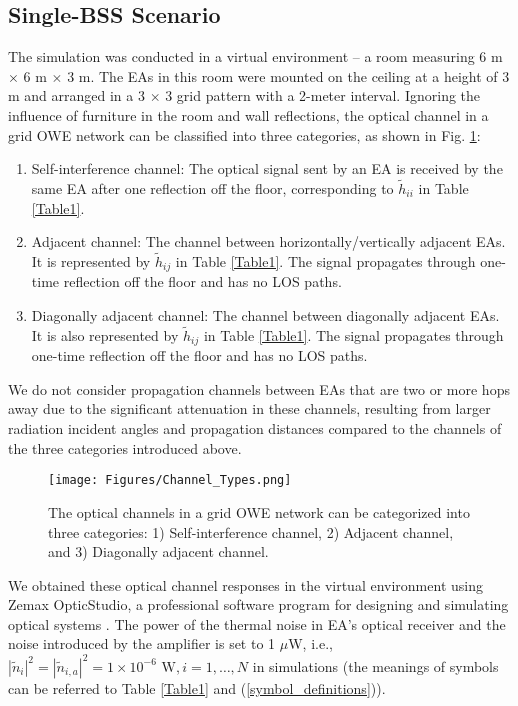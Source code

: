 \subsection{Single-BSS Scenario}
The simulation was conducted in a virtual environment -- a room measuring 6 m $\times$ 6 m $\times$ 3 m. The EAs in this room were mounted on the ceiling at a height of 3 m and arranged in a 3 $\times$ 3 grid pattern with a 2-meter interval.
Ignoring the influence of furniture in the room and wall reflections, the optical channel in a grid OWE network can be classified into three categories, as shown in Fig. \ref{channel_types}:
\begin{enumerate}
\item Self-interference channel: The optical signal sent by an EA is received by the same EA after one reflection off the floor, corresponding to $\widetilde{h}_{ii}$ in Table \ref{Table1}.
\item Adjacent channel: The channel between horizontally/vertically adjacent EAs. It is represented by $\widetilde{h}_{ij}$ in Table \ref{Table1}. The signal propagates through one-time reflection off the floor and has no LOS paths.
\item Diagonally adjacent channel: The channel between diagonally adjacent EAs. It is also represented by $\widetilde{h}_{ij}$ in Table \ref{Table1}. The signal propagates through one-time reflection off the floor and has no LOS paths.
\end{enumerate}
We do not consider propagation channels between EAs that are two or more hops away due to the significant attenuation in these channels, resulting from larger radiation incident angles and propagation distances compared to the channels of the three categories introduced above.
\begin{figure}
\centering
\texttt{[image: Figures/Channel\_Types.png]}
\caption{The optical channels in a grid OWE network can be categorized into three categories: 1) Self-interference channel, 2) Adjacent channel, and 3) Diagonally adjacent channel.}
\label{channel_types}
\vspace{-0.4cm}
\end{figure}
\par
We obtained these optical channel responses in the virtual environment using Zemax OpticStudio, a professional software program for designing and simulating optical systems \cite{ansys}. The power of the thermal noise in EA's optical receiver and the noise introduced by the amplifier is set to 1 $\mu$W, i.e., $|\widetilde{n}_i|^2=|\widetilde{n}_{i,a}|^2=1\times 10^{-6} \text{ W}, i=1,\dots, N$ in simulations (the meanings of symbols can be referred to Table \ref{Table1} and (\ref{symbol_definitions})).
